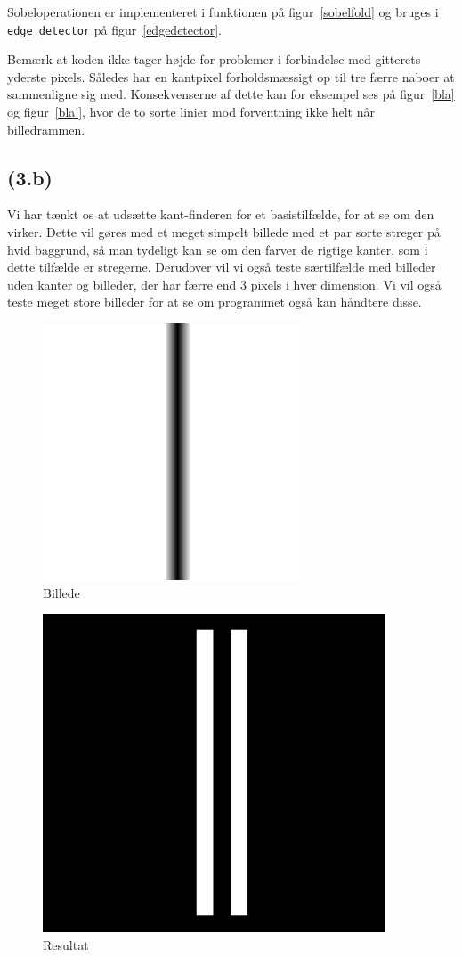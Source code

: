 \documentclass{article}
\begin{document}
Sobeloperationen er implementeret i funktionen på figur~\ref{sobelfold} og bruges i {\tt edge\_detector} på figur~\ref{edgedetector}.

Bemærk at koden ikke tager højde for problemer i forbindelse med gitterets yderste pixels. Således har en kantpixel forholdsmæssigt op til tre færre naboer at sammenligne sig med. Konsekvenserne af dette kan for eksempel ses på figur~\ref{bla} og figur~\ref{bla'}, hvor de to sorte linier mod forventning ikke helt når billedrammen.

\subsection*{(3.b)}

Vi har tænkt os at udsætte kant-finderen for et 
	basistilfælde, for at se om den virker. Dette vil gøres
	med et meget simpelt billede med et par sorte streger
	på hvid baggrund, så man tydeligt kan se om den farver
	de rigtige kanter, som i dette tilfælde er stregerne.
	Derudover vil vi også teste særtilfælde med billeder 
	uden kanter og billeder, der har færre end 3 pixels
	i hver dimension. Vi vil også teste meget store 
	billeder for at se om programmet også kan håndtere
	disse.
	\begin{figure}
		\centering
		\includegraphics[width=3in]{test1.png}
		\caption{Billede}
		\label{ke1}
	\end{figure}
	\begin{figure}
		\centering
		\includegraphics[width=4in]{test1_result.png}
		\caption{Resultat}
		\label{ke1r}
	\end{figure}
\end{document}
